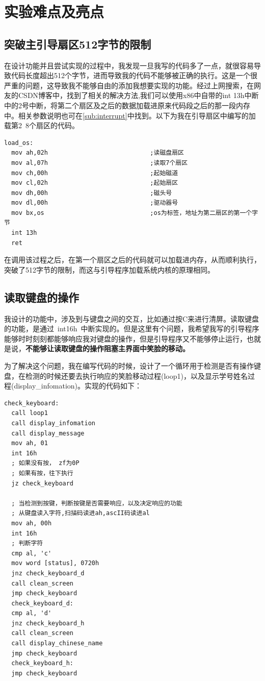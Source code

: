\documentclass[forprint]{WHUBachelor}
\begin{document}
\chapter{实验难点及亮点}

\section{突破主引导扇区512字节的限制}

在设计功能并且尝试实现的过程中，我发现一旦我写的代码多了一点，就很容易导致代码长度超出512个字节，进而导致我的代码不能够被正确的执行。这是一个很严重的问题，这导致我不能够自由的添加我想要实现的功能。经过上网搜索，在网友的CSDN博客\cite{noauthor_boot_nodate}中，找到了相关的解决方法,我们可以使用x86中自带的int 13h中断\cite{wiki:int13}中的2号中断，将第二个扇区及之后的数据加载进原来代码段之后的那一段内存中。相关参数说明也可在\autoref{sub:interrupt}中找到。以下为我在引导扇区中编写的加载第2~8个扇区的代码。

\begin{lstlisting}[language={[x86masm]Assembler}] 
load_os:
  mov ah,02h                            ;读磁盘扇区
  mov al,07h                            ;读取7个扇区
  mov ch,00h                            ;起始磁道
  mov cl,02h                            ;起始扇区
  mov dh,00h                            ;磁头号
  mov dl,00h                            ;驱动器号
  mov bx,os                             ;os为标签，地址为第二扇区的第一个字节
  int 13h
  ret
\end{lstlisting}

在调用该过程之后，在第一个扇区之后的代码就可以加载进内存，从而顺利执行，突破了512字节的限制，而这与引导程序加载系统内核的原理相同。

\section{读取键盘的操作}

我设计的功能中，涉及到与键盘之间的交互，比如通过按C来进行清屏。读取键盘的功能，是通过~int16h~中断实现的。但是这里有个问题，我希望我写的引导程序能够时时刻刻都能够响应我对键盘的操作，但是引导程序又不能够停止运行，也就是说，\textbf{不能够让读取键盘的操作阻塞主界面中笑脸的移动。} 

为了解决这个问题，我在编写代码的时候，设计了一个循环用于检测是否有操作键盘，在检测的时候还要去执行响应的笑脸移动过程(loop1)，以及显示学号姓名过程(display\_infomation)。实现的代码如下：

\begin{lstlisting}[language={[x86masm]Assembler}] 
check_keyboard:
  call loop1
  call display_infomation
  call display_message
  mov ah, 01
  int 16h
  ; 如果没有按， zf为0P
  ; 如果有按，往下执行
  jz check_keyboard

  ; 当检测到按键，判断按键是否需要响应，以及决定响应的功能
  ; 从键盘读入字符,扫描码读进ah,ascII码读进al
  mov ah, 00h
  int 16h
  ; 判断字符
  cmp al, 'c'
  mov word [status], 0720h
  jnz check_keyboard_d 
  call clean_screen
  jmp check_keyboard
  check_keyboard_d:
  cmp al, 'd'
  jnz check_keyboard_h
  call clean_screen
  call display_chinese_name
  jmp check_keyboard
  check_keyboard_h:
  jmp check_keyboard
\end{lstlisting}
 
\end{document}
